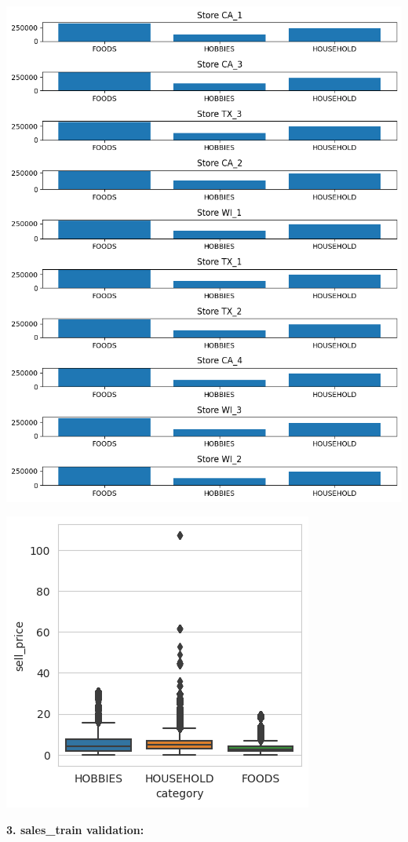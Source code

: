 \documentclass[fleqn,10pt]{SelfArx} %
\begin{document}
\includegraphics[scale=0.4]{24.png}

\includegraphics[scale=0.7]{25.png}

\item \textbf{3. sales\_train validation:}
\end{document}
